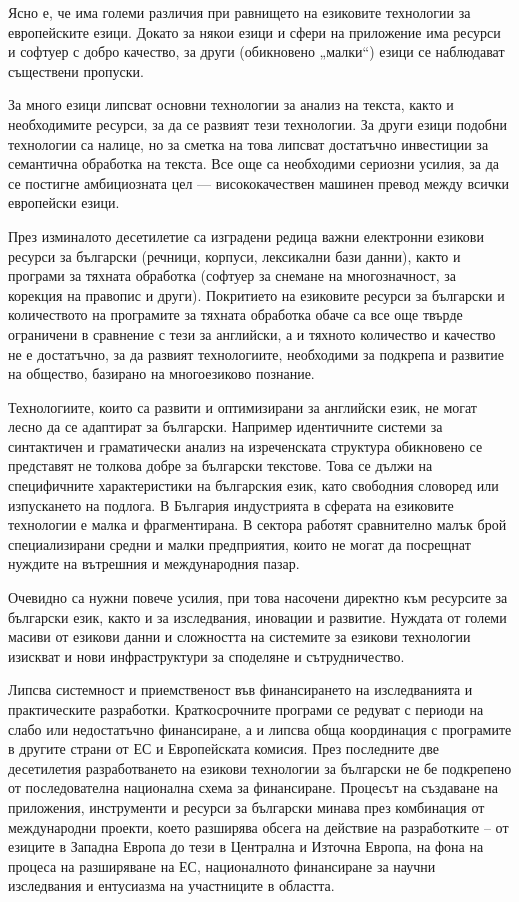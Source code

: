 \begin{multicols}{2}
Ясно е, че има големи различия при равнището на езиковите технологии за европейските езици. Докато за някои езици и сфери на приложение има ресурси и софтуер с добро качество, за други (обикновено „малки“) езици се наблюдават съществени пропуски. 

За много езици липсват основни технологии за анализ на текста, както и необходимите ресурси, за да се развият тези технологии. За други езици подобни технологии са налице, но за сметка на това липсват достатъчно инвестиции за семантична обработка на текста. Все още са необходими сериозни усилия, за да се постигне амбициозната цел — висококачествен машинен превод между всички европейски езици.

През изминалото десетилетие са изградени редица важни електронни езикови
ресурси за български (речници, корпуси, лексикални бази данни),
както и програми за тяхната обработка (софтуер за
снемане на многозначност, за корекция на правопис
и други). Покритието на езиковите ресурси за български и количеството на  програмите за тяхната обработка  обаче са все още твърде ограничени в сравнение с тези за английски, а и тяхното количество и качество не е достатъчно, за да развият технологиите, необходими за подкрепа и развитие на общество, базирано на многоезиково познание. 

Технологиите, които са развити и оптимизирани за английски език, не могат лесно да се адаптират за български. Например идентичните системи за синтактичен и граматически анализ на изреченската структура обикновено се представят не толкова добре за български текстове. Това се дължи на специфичните характеристики на българския език, като свободния словоред или изпускането на подлога.
В България индустрията в сферата на езиковите технологии е малка и фрагментирана. В сектора работят сравнително малък брой специализирани средни и малки предприятия, които не могат да посрещнат нуждите на вътрешния и международния пазар.

Очевидно са нужни повече усилия, при това
насочени директно към ресурсите за български език,
както и за изследвания, иновации и развитие.
Нуждата от големи масиви от езикови данни и
сложността на системите за езикови технологии
изискват и нови инфраструктури за споделяне и
сътрудничество.

Липсва системност и приемственост във финансирането на изследванията и практическите разработки. Краткосрочните програми се редуват с периоди на слабо или недостатъчно финансиране, а и липсва обща координация с програмите в другите страни от ЕС и Европейската комисия.
През последните две десетилетия разработването на
езикови технологии за български не бе подкрепено
от последователна национална схема за
финансиране. Процесът на създаване на
приложения, инструменти и ресурси за български
минава през комбинация от международни проекти,
което разширява обсега на действие на разработките
– от езиците в Западна Европа до тези в Централна
и Източна Европа, на фона на процеса на
разширяване на ЕС, националното финансиране за
научни изследвания и ентусиазма на участниците в
областта.


\end{multicols}
